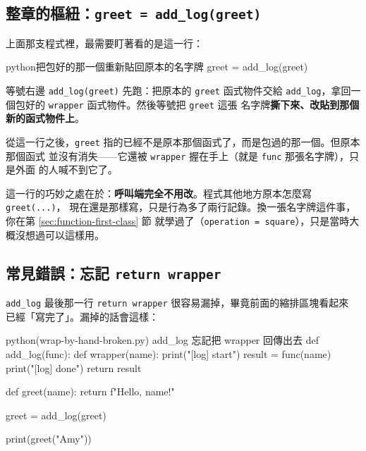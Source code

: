 \subsection*{整章的樞紐：\texttt{greet = add\_log(greet)}}

上面那支程式裡，最需要盯著看的是這一行：

\begin{code}{python}{把包好的那一個重新貼回原本的名字牌}
greet = add_log(greet)
\end{code}

等號右邊 \texttt{add\_log(greet)} 先跑：把原本的 \texttt{greet} 函式物件交給
\texttt{add\_log}，拿回一個包好的 \texttt{wrapper} 函式物件。然後等號把 \texttt{greet} 這張
名字牌\textbf{撕下來、改貼到那個新的函式物件上}。

從這一行之後，\texttt{greet} 指的已經不是原本那個函式了，而是包過的那一個。但原本那個函式
並沒有消失——它還被 \texttt{wrapper} 握在手上（就是 \texttt{func} 那張名字牌），只是外面
的人喊不到它了。

這一行的巧妙之處在於：\textbf{呼叫端完全不用改}。程式其他地方原本怎麼寫 \texttt{greet(...)}，
現在還是那樣寫，只是行為多了兩行記錄。換一張名字牌這件事，你在第 \ref{sec:function-first-class} 節
就學過了（\texttt{operation = square}），只是當時大概沒想過可以這樣用。


\subsection*{常見錯誤：忘記 \texttt{return wrapper}}

\texttt{add\_log} 最後那一行 \texttt{return wrapper} 很容易漏掉，畢竟前面的縮排區塊看起來
已經「寫完了」。漏掉的話會這樣：

\begin{example}{python}{(wrap-by-hand-broken.py) add\_log 忘記把 wrapper 回傳出去}
def add_log(func):
    def wrapper(name):
        print("[log] start")
        result = func(name)
        print("[log] done")
        return result


def greet(name):
    return f"Hello, {name}!"


greet = add_log(greet)

print(greet("Amy"))
\end{example}

